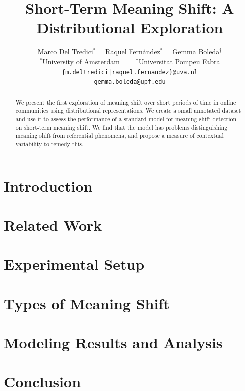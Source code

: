 \documentclass[11pt,a4paper]{article}
\title{Short-Term Meaning Shift: A Distributional Exploration}
\author{Marco Del Tredici$^*$ \ \ Raquel Fern\'andez$^*$ \ \  Gemma Boleda$^\dagger$\\
$^*$University of Amsterdam \ \ \ \ $^\dagger$Universitat Pompeu Fabra\\
  {\tt \{m.deltredici|raquel.fernandez\}@uva.nl}\\  
  {\tt gemma.boleda@upf.edu}
}
\date{}
\begin{document}
\maketitle
\begin{abstract}
We present the first exploration of meaning shift over short periods of time in online communities using distributional representations. We create a small annotated dataset and use it to assess the performance of a standard model for meaning shift detection on short-term meaning shift. We find that the model has problems distinguishing meaning shift from referential phenomena, and propose a measure of contextual variability to remedy this.
\end{abstract}

\section{Introduction}
\label{sect:Introduction}

 
\section{Related Work}
\label{sect:Related_Work}


\section{Experimental Setup}
\label{sec:setup}


\section{Types of Meaning Shift}
\label{sec:types}


\section{Modeling Results and Analysis}
\label{sec:results}


\section{Conclusion}
\label{sect:conc}

\end{document}
